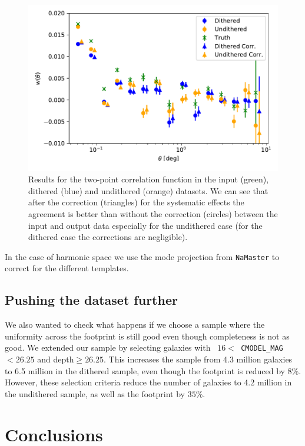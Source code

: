 \documentclass[\docopts]{\docclass}
\begin{document}
\begin{figure}
\centering
\includegraphics[width=0.9\columnwidth]{w_comp_corr25p3.pdf}
\caption{Results for the two-point correlation function in the input (green), dithered (blue) and undithered (orange) datasets. We can see that after the correction (triangles) for the systematic effects the agreement is better than without the correction (circles) between the input and output data especially for the undithered case (for the dithered case the corrections are negligible).} 
\label{fig:2pt_corr}
\end{figure}

In the case of harmonic space we use the mode projection from \texttt{NaMaster} to correct for the different templates.

\subsection{Pushing the dataset further}

We also wanted to check what happens if we choose a sample where the uniformity across the footprint is still good even though completeness is not as good. We extended our sample by selecting galaxies with \texttt{ $16 < $ CMODEL\_MAG $ < 26.25$} and depth$\geq 26.25$. This increases the sample from 4.3 million galaxies to 6.5 million in the dithered sample, even though the footprint is reduced by $8\%$. However, these selection criteria reduce the number of galaxies to 4.2 million in the undithered sample, as well as the footprint by $35\%$.

\section{Conclusions}
\label{sec:conclusions}
\end{document}
